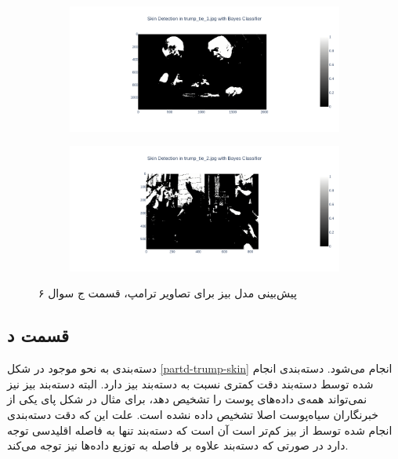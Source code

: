 \documentclass{article}
\begin{document}
\begin{figure}[h]
    \begin{subfigure}{.45\linewidth}
        \centering
        \includegraphics[width=\linewidth]{images/q6/trump_partc.png}
    \end{subfigure}
    \hfill
    \begin{subfigure}{.45\linewidth}
        \centering
        \includegraphics[width=\linewidth]{images/q6/trump_partc2.png}
    \end{subfigure}
    \caption{پیش‌بینی مدل بیز برای تصاویر ترامپ، قسمت ج سوال ۶}
    \label{partc-trump-skin}
\end{figure}

\subsection*{قسمت د}

دسته‌بندی به نحو موجود در شکل \ref{partd-trump-skin} انجام می‌شود. دسته‌بندی انجام شده توسط دسته‌بند 
دقت کمتری نسبت به دسته‌بند بیز دارد. البته دسته‌بند بیز نیز نمی‌تواند همه‌ی داده‌های پوست را تشخیص دهد، برای مثال در
شکل  پای یکی از خبرنگاران سیاه‌پوست اصلا تشخیص داده نشده است. علت این که دقت دسته‌بندی
انجام شده توسط  از بیز کم‌تر است آن است که دسته‌بند  تنها به فاصله اقلیدسی توجه دارد در صورتی که
دسته‌بند  علاوه بر فاصله به توزیع داده‌ها نیز توجه می‌کند.
\end{document}
